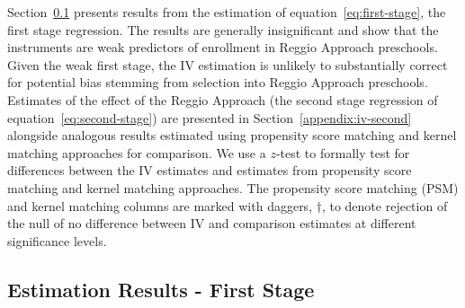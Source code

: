 Section~\ref{appendix:iv-first} presents results from the estimation of equation~\eqref{eq:first-stage}, the first stage regression. The results are generally insignificant and show that the instruments are weak predictors of enrollment in Reggio Approach preschools. Given the weak first stage, the IV estimation is unlikely to substantially correct for potential bias stemming from selection into Reggio Approach preschools. Estimates of the effect of the Reggio Approach (the second stage regression of equation~\eqref{eq:second-stage}) are presented in Section~\ref{appendix:iv-second} alongside analogous results estimated using propensity score matching and kernel matching approaches for comparison. We use a $z$-test to formally test for differences between the IV estimates and estimates from propensity score matching and kernel matching approaches. The propensity score matching (PSM) and kernel matching columns are marked with daggers, $\bm{\dagger}$, to denote rejection of the null of no difference between IV and comparison estimates at different significance levels.

\subsection{Estimation Results - First Stage}\label{appendix:iv-first}
\begin{table}[H]
\centering
{}
\end{table}

